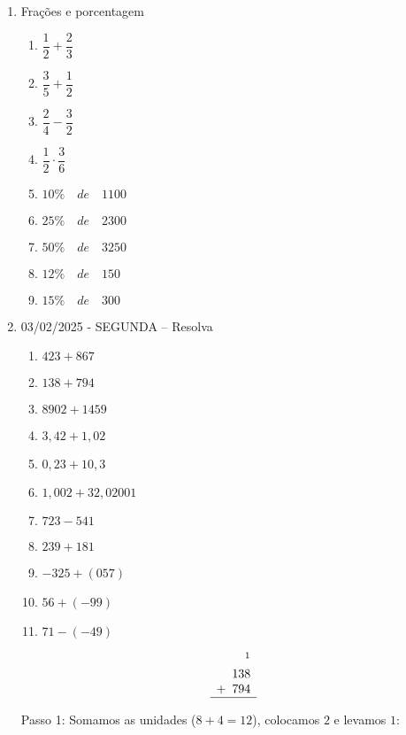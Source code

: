 \begin{enumerate}
\begin{enumerate}
			
	\end{enumerate}
	\item Frações e porcentagem
		
		\begin{enumerate}
			\item  $ \dfrac{1}{2} + \dfrac{2}{3} $
			\item  $    \dfrac{3}{5} + \dfrac{1}{2} $
			\item  $ \dfrac{2}{4} - \dfrac{3}{2} $
			\item  $  \dfrac{1}{2} \cdot  \dfrac{3}{6} $
			\item  $  10\% \quad de \quad  1100 $
			\item  $  25\% \quad de \quad 2300 $
			\item  $  50\% \quad de \quad 3250 $
			\item  $  12\% \quad de \quad 150 $
			\item  $  15\% \quad de \quad 300 $
		\end{enumerate}
		
	\item 03/02/2025 - SEGUNDA -- Resolva
	\begin{enumerate}
		\item  $423 + 867 $
		\item  $   138 + 794 $
		\item  $   8902 + 1459 $
		\item  $   3,42 + 1,02 $
		\item  $   0,23 + 10,3 $
		\item  $   1,002 + 32,02001 $
		\item  $   723 - 541 $
		\item  $   239 + 181 $
		\item  $   -325 + (057)$
		\item  $   56 + (-99) $
		\item  $   71 - (-49) $
		
	\end{enumerate}
	

		\[
		\begin{array}{r}
			\phantom{1} \phantom{1} \phantom{1} \phantom{1}^1 \\
			\phantom{+}138 \\
			+ \phantom{0}794 \\
			\hline
		\end{array}
		\]
		
		Passo 1: Somamos as unidades (\(8 + 4 = 12\)), colocamos \(2\) e levamos \(1\):
		

\end{enumerate}
